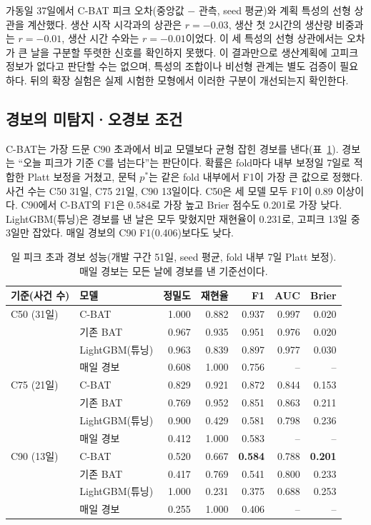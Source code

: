 가동일 37일에서 C-BAT 피크 오차(중앙값 $-$ 관측, seed 평균)와 계획 특성의 선형 상관을 계산했다. 생산 시작 시각과의 상관은 $r=-0.03$, 생산 첫 2시간의 생산량 비중과는 $r=-0.01$, 생산 시간 수와는 $r=-0.01$이었다. 이 세 특성의 선형 상관에서는 오차가 큰 날을 구분할 뚜렷한 신호를 확인하지 못했다. 이 결과만으로 생산계획에 고피크 정보가 없다고 판단할 수는 없으며, 특성의 조합이나 비선형 관계는 별도 검증이 필요하다. 뒤의 확장 실험은 실제 시험한 모형에서 이러한 구분이 개선되는지 확인한다.

\subsection{경보의 미탐지·오경보 조건}

C-BAT는 가장 드문 C90 초과에서 비교 모델보다 균형 잡힌 경보를 낸다(표~\ref{tab:ch4-alarm}). 경보는 ``오늘 피크가 기준 C를 넘는다''는 판단이다. 확률은 fold마다 내부 보정일 7일로 적합한 Platt 보정을 거쳤고, 문턱 $p^*$는 같은 fold 내부에서 F1이 가장 큰 값으로 정했다. 사건 수는 C50 31일, C75 21일, C90 13일이다. C50은 세 모델 모두 F1이 0.89 이상이다. C90에서 C-BAT의 F1은 0.584로 가장 높고 Brier 점수도 0.201로 가장 낮다. LightGBM(튜닝)은 경보를 낸 날은 모두 맞혔지만 재현율이 0.231로, 고피크 13일 중 3일만 잡았다. 매일 경보의 C90 F1(0.406)보다도 낮다.

\begin{table}[htbp]
\centering
\caption{일 피크 초과 경보 성능(개발 구간 51일, seed 평균, fold 내부 7일 Platt 보정). 매일 경보는 모든 날에 경보를 낸 기준선이다.}
\label{tab:ch4-alarm}
\small
\begin{tabular}{llrrrrr}
\toprule
기준(사건 수) & 모델 & 정밀도 & 재현율 & F1 & AUC & Brier \\
\midrule
C50 (31일) & C-BAT & 1.000 & 0.882 & 0.937 & 0.997 & 0.020 \\
 & 기존 BAT & 0.967 & 0.935 & 0.951 & 0.976 & 0.020 \\
 & LightGBM(튜닝) & 0.963 & 0.839 & 0.897 & 0.977 & 0.030 \\
 & 매일 경보 & 0.608 & 1.000 & 0.756 & -- & -- \\
\midrule
C75 (21일) & C-BAT & 0.829 & 0.921 & 0.872 & 0.844 & 0.153 \\
 & 기존 BAT & 0.769 & 0.952 & 0.851 & 0.863 & 0.211 \\
 & LightGBM(튜닝) & 0.900 & 0.429 & 0.581 & 0.798 & 0.236 \\
 & 매일 경보 & 0.412 & 1.000 & 0.583 & -- & -- \\
\midrule
C90 (13일) & C-BAT & 0.520 & 0.667 & \textbf{0.584} & 0.788 & \textbf{0.201} \\
 & 기존 BAT & 0.417 & 0.769 & 0.541 & 0.800 & 0.233 \\
 & LightGBM(튜닝) & 1.000 & 0.231 & 0.375 & 0.688 & 0.253 \\
 & 매일 경보 & 0.255 & 1.000 & 0.406 & -- & -- \\
\bottomrule
\end{tabular}
\end{table}

